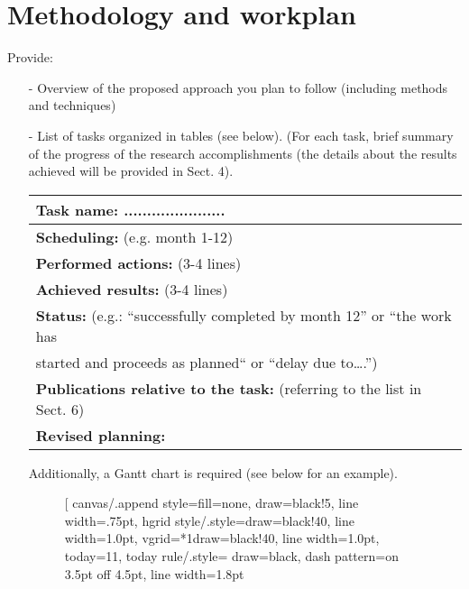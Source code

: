 \section{Methodology and workplan}

Provide: 
\begin{itemize}
	\item[-] Overview of the proposed approach you plan to follow (including methods and techniques)
	\item[-] List of tasks organized in tables (see below). (For each task, brief summary of the progress of the research accomplishments (the details about the results achieved will be provided in Sect. 4). 
	
	\begin{table}[h]
		\begin{center}
			\renewcommand{\arraystretch}{1.3} %
			\setlength{\tabcolsep}{8pt} %
			\begin{tabular}{|P{15cm}|}
				\hline
				\textbf{Task name: ......................} \\ \hline
				\textbf{Scheduling: }(e.g. month 1-12) \\ \hline
				\textbf{Performed actions: }(3-4 lines)\\
				\hline
    				\textbf{Achieved results: }(3-4 lines)\\
				\hline
				\textbf{Status: }(e.g.: “successfully completed by month 12” or “the work has \\ started and proceeds as planned“ or “delay due to….”)\\
				\hline
				\textbf{Publications relative to the task: } (referring to the list in Sect. 6)\\
				\hline
				\textbf{Revised planning: }\\
				\hline
			\end{tabular}
		\end{center}
	\end{table}
	Additionally, a Gantt chart is required (see below for an example).
	\begin{figure}[h]
		\begin{center}
			\begin{ganttchart}[
				canvas/.append style={fill=none, draw=black!5, line width=.75pt},
				hgrid style/.style={draw=black!40, line width=1.0pt},
				vgrid={*1{draw=black!40, line width=1.0pt}},
				today=11,
				today rule/.style={
					draw=black,
					dash pattern=on 3.5pt off 4.5pt,
					line width=1.8pt
}
\end{ganttchart}
\end{center}
\end{figure}
\end{itemize}
